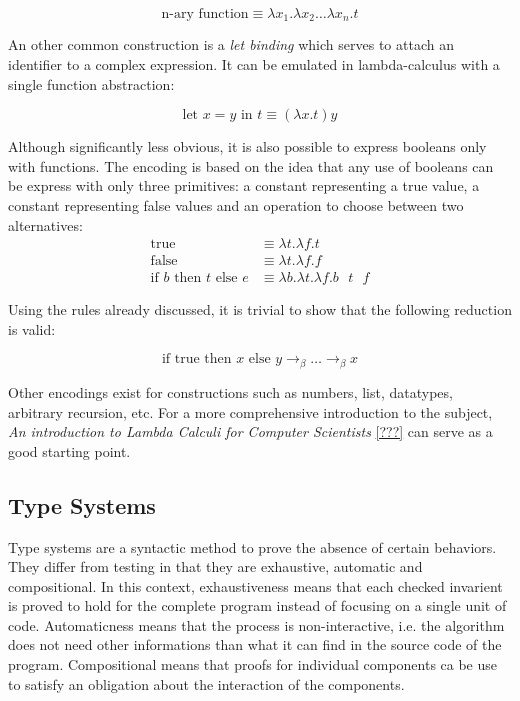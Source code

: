 \begin{displaymath}
  \text{n-ary function} \equiv \lambda x_1. \lambda x_2 \dots \lambda x_n. t
\end{displaymath}

An other common construction is a \emph{let binding} which serves to attach an identifier to a
complex expression. It can be emulated in lambda-calculus with a single function abstraction:

\begin{displaymath}
  \text{let } x = y \text{ in } t \equiv (\lambda x. t) y
\end{displaymath}

Although significantly less obvious, it is also possible to express booleans only with functions.
The encoding is based on the idea that any use of booleans can be express with only three
primitives: a constant representing a true value, a constant representing false values and an
operation to choose between two alternatives:
\begin{align*}
  \text{true}
    & \equiv \lambda t. \lambda f. t \\
  \text{false}
    & \equiv \lambda t. \lambda f. f \\
  \text{if } b \text{ then } t \text{ else } e
    & \equiv \lambda b. \lambda t. \lambda f. b \text{ } t \text{ } f
\end{align*}

Using the rules already discussed, it is trivial to show that the following reduction is valid:

\begin{displaymath}
  \text{if true then } x \text{ else } y \to_\beta \dots \to_\beta x
\end{displaymath}

Other encodings exist for constructions such as numbers, list, datatypes, arbitrary recursion, etc.
For a more comprehensive introduction to the subject, \emph{An introduction to Lambda Calculi for
Computer Scientists} \ref{???} can serve as a good starting point.

\subsection{Type Systems}

Type systems are a syntactic method to prove the absence of certain behaviors. They differ from
testing in that they are exhaustive, automatic and compositional. In this context, exhaustiveness
means that each checked invarient is proved to hold for the complete program instead of focusing on
a single unit of code. Automaticness means that the process is non-interactive, i.e. the algorithm
does not need other informations than what it can find in the source code of the program.
Compositional means that proofs for individual components ca be use to satisfy an obligation about
the interaction of the components.

